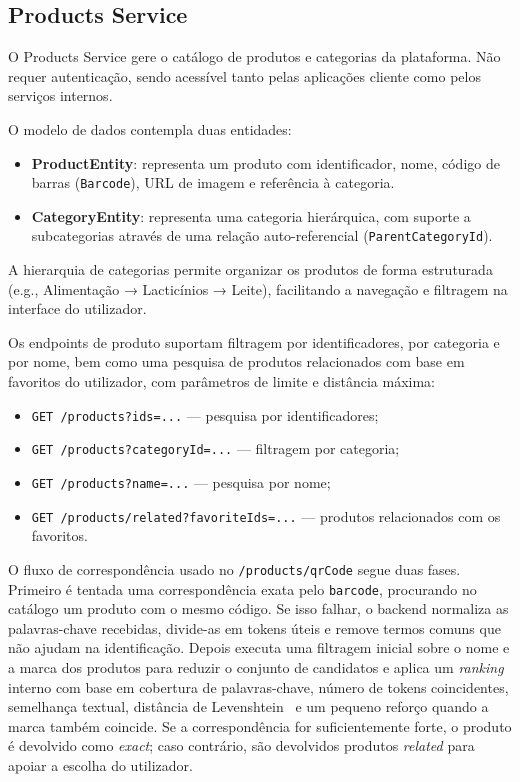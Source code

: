 \subsection{Products Service}
\label{sec:4.2.2}

O Products Service gere o catálogo de produtos e categorias da plataforma. Não requer autenticação, sendo acessível tanto pelas aplicações cliente como pelos serviços internos.

O modelo de dados contempla duas entidades:

\begin{itemize}
    \item \textbf{ProductEntity}: representa um produto com identificador, nome, código de barras (\texttt{Barcode}), URL de imagem e referência à categoria.
    \item \textbf{CategoryEntity}: representa uma categoria hierárquica, com suporte a subcategorias através de uma relação auto-referencial (\texttt{ParentCategoryId}).
\end{itemize}

A hierarquia de categorias permite organizar os produtos de forma estruturada (e.g., Alimentação → Lacticínios → Leite), facilitando a navegação e filtragem na interface do utilizador.

Os endpoints de produto suportam filtragem por identificadores, por categoria e por nome, bem como uma pesquisa de produtos relacionados com base em favoritos do utilizador, com parâmetros de limite e distância máxima:

\begin{itemize}
    \item \texttt{GET /products?ids=...} — pesquisa por identificadores;
    \item \texttt{GET /products?categoryId=...} — filtragem por categoria;
    \item \texttt{GET /products?name=...} — pesquisa por nome;
    \item \texttt{GET /products/related?favoriteIds=...} — produtos relacionados com os favoritos.
\end{itemize}

O fluxo de correspondência usado no \texttt{/products/qrCode} segue duas fases. Primeiro é tentada uma correspondência exata pelo \texttt{barcode}, procurando no catálogo um produto com o mesmo código. Se isso falhar, o backend normaliza as palavras-chave recebidas, divide-as em tokens úteis e remove termos comuns que não ajudam na identificação. Depois executa uma filtragem inicial sobre o nome e a marca dos produtos para reduzir o conjunto de candidatos e aplica um \textit{ranking} interno com base em cobertura de palavras-chave, número de tokens coincidentes, semelhança textual, distância de Levenshtein~\cite{levenshtein-1966} e um pequeno reforço quando a marca também coincide. Se a correspondência for suficientemente forte, o produto é devolvido como \textit{exact}; caso contrário, são devolvidos produtos \textit{related} para apoiar a escolha do utilizador.

